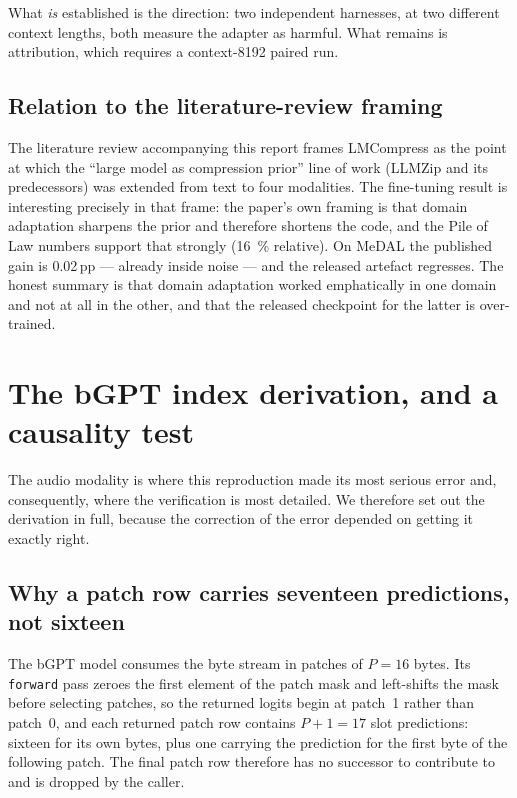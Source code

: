 \documentclass[11pt,a4paper]{article}
\newcommand{\code}[1]{\texttt{\small #1}}
\begin{document}
What \emph{is} established is the direction: two independent harnesses, at two
different context lengths, both measure the adapter as harmful. What remains is
attribution, which requires a context-8192 paired run.

\subsection{Relation to the literature-review framing}

The literature review accompanying this report frames LMCompress as the point at
which the ``large model as compression prior'' line of work (LLMZip and its
predecessors) was extended from text to four modalities. The fine-tuning result is
interesting precisely in that frame: the paper's own framing is that domain
adaptation sharpens the prior and therefore shortens the code, and the Pile of Law
numbers support that strongly (\SI{16}{\%} relative). On MeDAL the published
gain is \num{0.02}\,pp --- already inside noise --- and the released artefact
regresses. The honest summary is that domain adaptation worked emphatically in one
domain and not at all in the other, and that the released checkpoint for the
latter is over-trained.


\section{The bGPT index derivation, and a causality test}
\label{ch:bgpt}

The audio modality is where this reproduction made its most serious error and,
consequently, where the verification is most detailed. We therefore set out the
derivation in full, because the correction of the error depended on getting it
exactly right.

\subsection{Why a patch row carries seventeen predictions, not sixteen}

The bGPT model consumes the byte stream in patches of $P = 16$ bytes. Its
\code{forward} pass zeroes the first element of the patch mask and left-shifts the
mask before selecting patches, so the returned logits begin at patch~1 rather
than patch~0, and each returned patch row contains $P+1 = 17$ slot predictions:
sixteen for its own bytes, plus one carrying the prediction for the first byte of
the following patch. The final patch row therefore has no successor to contribute
to and is dropped by the caller.
\end{document}
